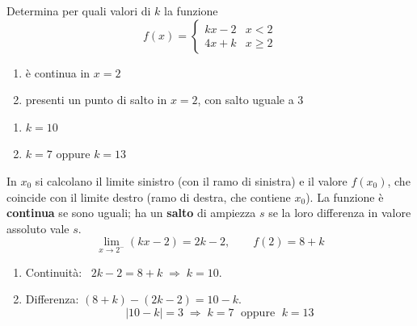 \begin{question}[ID=4.4, subtitle={Continuità e salto di $f$ con $kx-2$ e $4x+k$ in $x=2$}, tags={continuità, parametrico}, difficulty=media]
Determina per quali valori di $k$ la funzione
\[
f(x) = \begin{cases}
    kx - 2 & x < 2 \\
    4x + k & x \ge 2
\end{cases}
\]
\begin{enumerate}
\item è continua in $x=2$
\item presenti un punto di salto in $x=2$, con salto uguale a $3$
\end{enumerate}
\begin{solution}
\begin{enumerate}
    \item $k=10$
    \item $k=7$ oppure $k=13$
\end{enumerate}
\end{solution}
\begin{explanation}
In $x_0$ si calcolano il limite sinistro (con il ramo di sinistra) e il valore $f(x_0)$, che coincide con il limite destro (ramo di destra, che contiene $x_0$). La funzione è \textbf{continua} se sono uguali; ha un \textbf{salto} di ampiezza $s$ se la loro differenza in valore assoluto vale $s$.
\[ \lim_{x\to2^-}(kx-2)=2k-2, \qquad f(2)=8+k \]
\begin{enumerate}
    \item Continuità: \ $2k-2=8+k \;\Rightarrow\; k=10$.
    \item Differenza: $(8+k)-(2k-2)=10-k$.
    \[ |10-k|=3 \;\Rightarrow\; k=7 \;\text{ oppure }\; k=13 \]
\end{enumerate}
\end{explanation}
\end{question}


